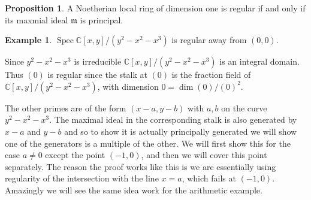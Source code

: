 \documentclass{article}
\DeclareMathOperator{\Spec}{Spec}
\newcommand{\m}{\ensuremath{\mathfrak{m}}}
\newcommand{\C}{\ensuremath{\mathbb{C}}}
\theoremstyle{definition}
\newcounter{dummy} \numberwithin{dummy}{section}
\newtheorem{prop}[dummy]{Proposition}
\newtheorem{example}[dummy]{Example}
\begin{document}
\begin{prop}
  A Noetherian local ring of dimension one is regular if and only if its maxmial ideal $\m$ is principal.
\end{prop}

\begin{example}
  $\Spec \C[x,y]/(y^2-x^2-x^3)$ is regular away from $(0,0)$.
  \label{geoSmoothEx}
\end{example}
\noindent
Since $y^2-x^2-x^3$ is irreducible $\C[x,y]/(y^2-x^2-x^3)$ is an integral domain.
Thus $(0)$ is regular since the stalk at $(0)$ is the fraction field of $\C[x,y]/(y^2-x^2-x^3)$, with dimension $0 = \dim (0)/(0)^2$.

The other primes are of the form $(x-a, y-b)$ with $a,b$ on the curve $y^2 - x^2 -x^3$.
The maximal ideal in the corresponding stalk is also generated by $x-a$ and $y-b$ and so to show it is actually principally generated we will show one of the generators is a multiple of the other.
We will first show this for the case $a \neq 0$ except the point $(-1,0)$, and then we will cover this point separately.
The reason the proof works like this is we are essentially using regularity of the intersection with the line $x=a$, which fails at $(-1,0)$.
Amazingly we will see the same idea work for the arithmetic example.
\end{document}
